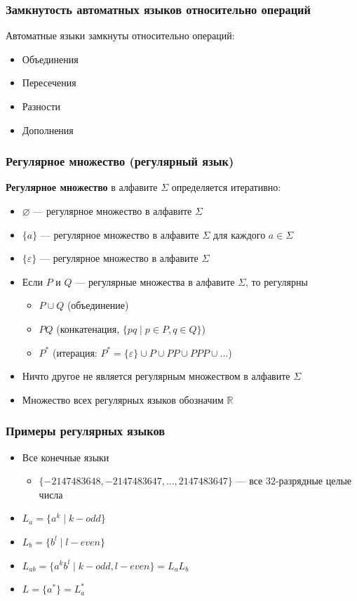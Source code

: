 \documentclass{beamer}
\begin{document}
\begin{frame}[fragile]
  \transwipe[direction=90]
  \frametitle{Замкнутость автоматных языков относительно операций}
  Автоматные языки замкнуты относительно операций: 

  \begin{itemize}
    \item Объединения
    \item Пересечения
    \item Разности
    \item Дополнения
  \end{itemize}
\end{frame}

\begin{frame}[fragile]
  \transwipe[direction=90]
  \frametitle{Регулярное множество (регулярный язык)}
    \textbf{Регулярное множество} в алфавите $\Sigma$ определяется итеративно:

    \begin{itemize}
      \item $\varnothing $ --- регулярное множество в алфавите $\Sigma$
      \item $\{a\}$  --- регулярное множество в алфавите $\Sigma$ для каждого $a \in \Sigma$
      \item $\{\varepsilon\}$  --- регулярное множество в алфавите $\Sigma$
      \item Если $P$ и $Q$ --- регулярные множества в алфавите $\Sigma$, то регулярны
      \begin{itemize}
        \item $P \cup Q$ (объединение)
        \item $PQ$ (конкатенация, $\{ pq \mid p \in P, q \in Q\}$)
        \item $P^*$ (итерация: $P^* = \{\varepsilon\} \cup P \cup PP \cup PPP \cup \dots $)
      \end{itemize}
      \item Ничто другое не является регулярным множеством в алфавите $\Sigma$
      \item Множество всех регулярных языков обозначим $\mathbb{R}$
    \end{itemize}
\end{frame}

\begin{frame}[fragile]
  \transwipe[direction=90]
  \frametitle{Примеры регулярных языков}
  \begin{itemize}
   \item Все конечные языки
    \begin{itemize}
     \item $\{-2 147 483 648, -2 147 483 647, \dots,  2 147 483 647\}$ --- все 32-разрядные целые числа
    \end{itemize}
    \item $L_a = \{a^k \mid k - odd \} $
    \item $L_b = \{b^l \mid l - even \} $
    \item $L_{ab} = \{a^k b^l \mid k - odd, l - even\} =  L_a L_b$   
    \item $L = \{a^*\} = L_a^*$
  \end{itemize}
  
  
\end{frame}
\end{document}
